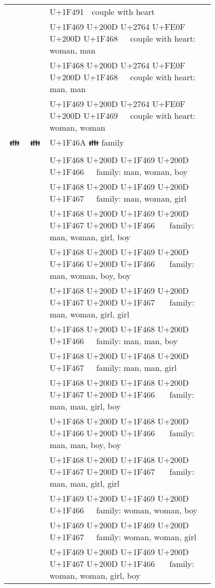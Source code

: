 \documentclass[a4paper,12pt]{ltjarticle}
\newcommand{\fontA}[1]{{\fontspec[RawFeature={mode=harf,+dist,+ccmp}]{Segoe UI Emoji} #1}}
\newcommand{\fontB}[1]{{\fontspec[RawFeature={mode=harf,+dist,+ccmp}]{Noto Color Emoji} #1}}
\begin{document}
\begin{longtable}[c]{ccp{0.8\linewidth}}
\fontA{💑}&\fontB{💑}&U+1F491 💑 couple with heart\\
\fontA{👩‍❤️‍👨}&\fontB{👩‍❤️‍👨}&U+1F469 U+200D U+2764 U+FE0F U+200D U+1F468 👩‍❤️‍👨 couple with heart: woman, man\\
\fontA{👨‍❤️‍👨}&\fontB{👨‍❤️‍👨}&U+1F468 U+200D U+2764 U+FE0F U+200D U+1F468 👨‍❤️‍👨 couple with heart: man, man\\
\fontA{👩‍❤️‍👩}&\fontB{👩‍❤️‍👩}&U+1F469 U+200D U+2764 U+FE0F U+200D U+1F469 👩‍❤️‍👩 couple with heart: woman, woman\\
\fontA{👪}&\fontB{👪}&U+1F46A 👪 family\\
\fontA{👨‍👩‍👦}&\fontB{👨‍👩‍👦}&U+1F468 U+200D U+1F469 U+200D U+1F466 👨‍👩‍👦 family: man, woman, boy\\
\fontA{👨‍👩‍👧}&\fontB{👨‍👩‍👧}&U+1F468 U+200D U+1F469 U+200D U+1F467 👨‍👩‍👧 family: man, woman, girl\\
\fontA{👨‍👩‍👧‍👦}&\fontB{👨‍👩‍👧‍👦}&U+1F468 U+200D U+1F469 U+200D U+1F467 U+200D U+1F466 👨‍👩‍👧‍👦 family: man, woman, girl, boy\\
\fontA{👨‍👩‍👦‍👦}&\fontB{👨‍👩‍👦‍👦}&U+1F468 U+200D U+1F469 U+200D U+1F466 U+200D U+1F466 👨‍👩‍👦‍👦 family: man, woman, boy, boy\\
\fontA{👨‍👩‍👧‍👧}&\fontB{👨‍👩‍👧‍👧}&U+1F468 U+200D U+1F469 U+200D U+1F467 U+200D U+1F467 👨‍👩‍👧‍👧 family: man, woman, girl, girl\\
\fontA{👨‍👨‍👦}&\fontB{👨‍👨‍👦}&U+1F468 U+200D U+1F468 U+200D U+1F466 👨‍👨‍👦 family: man, man, boy\\
\fontA{👨‍👨‍👧}&\fontB{👨‍👨‍👧}&U+1F468 U+200D U+1F468 U+200D U+1F467 👨‍👨‍👧 family: man, man, girl\\
\fontA{👨‍👨‍👧‍👦}&\fontB{👨‍👨‍👧‍👦}&U+1F468 U+200D U+1F468 U+200D U+1F467 U+200D U+1F466 👨‍👨‍👧‍👦 family: man, man, girl, boy\\
\fontA{👨‍👨‍👦‍👦}&\fontB{👨‍👨‍👦‍👦}&U+1F468 U+200D U+1F468 U+200D U+1F466 U+200D U+1F466 👨‍👨‍👦‍👦 family: man, man, boy, boy\\
\fontA{👨‍👨‍👧‍👧}&\fontB{👨‍👨‍👧‍👧}&U+1F468 U+200D U+1F468 U+200D U+1F467 U+200D U+1F467 👨‍👨‍👧‍👧 family: man, man, girl, girl\\
\fontA{👩‍👩‍👦}&\fontB{👩‍👩‍👦}&U+1F469 U+200D U+1F469 U+200D U+1F466 👩‍👩‍👦 family: woman, woman, boy\\
\fontA{👩‍👩‍👧}&\fontB{👩‍👩‍👧}&U+1F469 U+200D U+1F469 U+200D U+1F467 👩‍👩‍👧 family: woman, woman, girl\\
\fontA{👩‍👩‍👧‍👦}&\fontB{👩‍👩‍👧‍👦}&U+1F469 U+200D U+1F469 U+200D U+1F467 U+200D U+1F466 👩‍👩‍👧‍👦 family: woman, woman, girl, boy\\

\end{longtable}
\end{document}
